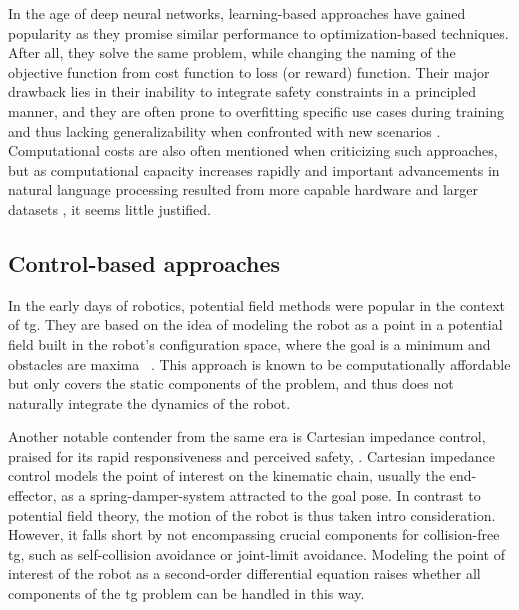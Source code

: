 In the age of deep neural networks, learning-based
approaches have gained popularity as they promise similar
performance to optimization-based techniques. After all,
they solve the same problem, while changing the naming of
the objective function from cost function to loss (or
reward) function. Their major drawback lies in their
inability to integrate safety constraints in a principled
manner, and they are often prone to overfitting specific use cases during
training and thus lacking generalizability when confronted
with new scenarios \cite{noroozi2023conventional}.
Computational costs are also often
mentioned when criticizing such approaches, but as
computational capacity increases rapidly and important
advancements in natural language processing resulted from
more capable hardware and larger datasets
\cite{radford2023robust},
it seems little
justified. 

\subsection*{Control-based approaches}
In the early days of robotics, potential field methods were
popular in the context of \ac{tg}.
They are based on the idea of modeling the robot as
a point in a potential field built in the robot's configuration
space, where the goal is a minimum
and obstacles are maxima
~\cite{barraquand1992numerical,hwang1992potential}. This
approach is known to be computationally affordable but
only covers the static components of the problem, and thus
does not naturally integrate the dynamics of the robot.

Another notable contender from the same era is Cartesian
impedance control, praised for its rapid responsiveness and
perceived safety, \cite{hogan1985impedance}. Cartesian
impedance control models the point of interest on the
kinematic chain, usually the end-effector, as a
spring-damper-system attracted to the goal pose. In contrast
to potential field theory, the motion of the robot is thus
taken intro consideration. However, it falls short by not
encompassing crucial components for collision-free
\ac{tg}, such as self-collision avoidance or joint-limit
avoidance.
Modeling the point of interest of the robot as a
second-order differential equation raises whether all
components of the \ac{tg} problem can be handled in this
way. 

